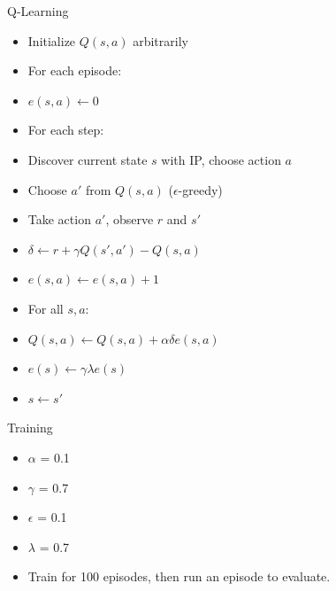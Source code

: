 \documentclass{beamer}
\begin{document}
\begin{frame}{Q-Learning}
  \begin{itemize}
    \item[] Initialize $Q(s, a)$ arbitrarily
    \item[] For each episode:
    \item[] \hspace{2em} $e(s, a) \leftarrow 0$
    \item[] \hspace{2em} For each step:
    \item[] \hspace{4em} Discover current state $s$ with IP, choose action $a$
    \item[] \hspace{4em} Choose $a'$ from $Q(s, a)$ ($\epsilon$-greedy)
    \item[] \hspace{4em} Take action $a'$, observe $r$ and $s'$
    \item[] \hspace{4em} $\delta \leftarrow r + \gamma Q(s', a') - Q(s, a)$
    \item[] \hspace{4em} $e(s, a) \leftarrow e(s, a) + 1$
    \item[] \hspace{4em} For all $s, a$:
    \item[] \hspace{6em} $Q(s, a) \leftarrow Q(s, a) + \alpha \delta e(s, a)$
    \item[] \hspace{6em} $e(s) \leftarrow \gamma \lambda e(s)$
    \item[] \hspace{4em} $s \leftarrow s'$
  \end{itemize}
\end{frame}

\begin{frame}{Training}
  \begin{itemize}
    \item $\alpha$ = 0.1
    \item $\gamma$ = 0.7
    \item $\epsilon$ = 0.1
    \item $\lambda$ = 0.7
  \end{itemize}
  \vspace{2em}
  \begin{itemize}
    \item Train for 100 episodes, then run an episode to evaluate.
  \end{itemize}
\end{frame}
\end{document}
